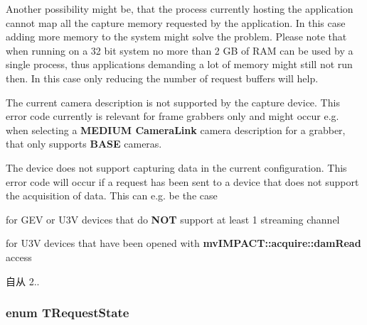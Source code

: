 \begin{Desc}
\begin{description}
Another possibility might be, that the process currently hosting the application cannot map all the capture memory requested by the application. In this case adding more memory to the system might solve the problem. Please note that when running on a 32 bit system no more than 2 G\+B of R\+A\+M can be used by a single process, thus applications demanding a lot of memory might still not run then. In this case only reducing the number of request buffers will help. \item[{\em 
\hypertarget{group___common_interface_ggab6148762ea638f8eabbabfc9468b0d4ca5a5cee2b2e942fae4849cb2bbf02f718}{rr\+Camera\+Not\+Supported}\label{group___common_interface_ggab6148762ea638f8eabbabfc9468b0d4ca5a5cee2b2e942fae4849cb2bbf02f718}
}]The current camera description is not supported by the capture device. This error code currently is relevant for frame grabbers only and might occur e.\+g. when selecting a {\bfseries M\+E\+D\+I\+U\+M Camera\+Link\textregistered{}} camera description for a grabber, that only supports {\bfseries B\+A\+S\+E} cameras. \item[{\em 
\hypertarget{group___common_interface_ggab6148762ea638f8eabbabfc9468b0d4ca4735d9776120cf613033ba89fd30b523}{rr\+Data\+Acquisition\+Not\+Supported}\label{group___common_interface_ggab6148762ea638f8eabbabfc9468b0d4ca4735d9776120cf613033ba89fd30b523}
}]The device does not support capturing data in the current configuration. This error code will occur if a request has been sent to a device that does not support the acquisition of data. This can e.\+g. be the case


\begin{DoxyItemize}
\item for G\+E\+V or U3\+V devices that do {\bfseries N\+O\+T} support at least 1 streaming channel
\item for U3\+V devices that have been opened with {\bfseries mv\+I\+M\+P\+A\+C\+T\+::acquire\+::dam\+Read} access
\end{DoxyItemize}

\begin{DoxySince}{自从}
2.. 
\end{DoxySince}
\end{description}
\end{Desc}
\hypertarget{group___common_interface_gacaa15d9102d56c38e659c31c678a640d}{
\subsubsection[{T\+Request\+State}]{\setlength{\rightskip}{0pt plus 5cm}enum {\bf T\+Request\+State}}}\label{group___common_interface_gacaa15d9102d56c38e659c31c678a640d}


